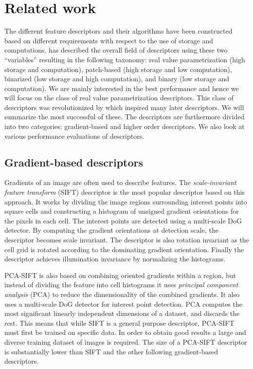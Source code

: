 \documentclass[../thesis.tex]{subfiles}
\begin{document}
\section{Related work}
The different feature descriptors and their algorithms have been constructed based on different requirements with respect to the use of storage and computations. \cite{heinly2012comparative} has described the overall field of descriptors using these two ``variables'' resulting in the following taxonomy: real value parametrization (high storage and computation), patch-based (high storage and low computation), binarized (low storage and high computation), and binary (low storage and computation). We are mainly interested in the best performance and hence we will focus on the class of real value parametrization descriptors. This class of descriptors was revolutionized by \cite{lowe2004distinctive} which inspired many later descriptors. We will summarize the most successful of these. The descriptors are furthermore divided into two categories: gradient-based and higher order descriptors. We also look at various performance evaluations of descriptors.

\subsection{Gradient-based descriptors}
Gradients of an image are often used to describe features. The \emph{scale-invariant feature transform} (SIFT) descriptor \cite{lowe2004distinctive} is the most popular descriptor based on this approach. It works by dividing the image regions surrounding interest points into square cells and constructing a histogram of unsigned gradient orientations for the pixels in each cell. The interest points are detected using a multi-scale DoG detector. By computing the gradient orientations at detection scale, the descriptor becomes scale invariant. The descriptor is also rotation invariant as the cell grid is rotated according to the dominating gradient orientation. Finally the descriptor achieves illumination invariance by normalizing the histograms.

PCA-SIFT \cite{ke2004pca} is also based on combining oriented gradients within a region, but instead of dividing the feature into cell histograms it uses \emph{principal component analysis} (PCA) to reduce the dimensionality of the combined gradients. It also uses a multi-scale DoG detector for interest point detection. PCA computes the most significant linearly independent dimensions of a dataset, and discards the rest. This means that while SIFT is a general purpose descriptor, PCA-SIFT must first be trained on specific data. In order to obtain good results a large and diverse training dataset of images is required. The size of a PCA-SIFT descriptor is substantially lower than SIFT and the other following gradient-based descriptors.
\end{document}
